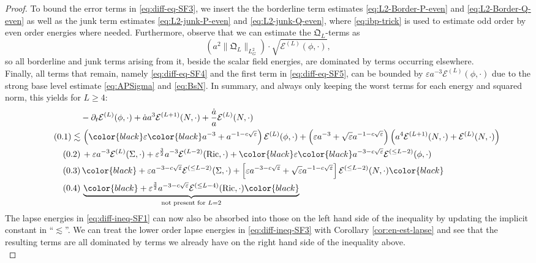\documentclass[11pt,leqno,textwidth=10cm]{amsart}
\numberwithin{equation}{section}
\theoremstyle{definition}
\theoremstyle{plain}
\newcommand{\1}{\mathbbm{1}}
\newcommand{\E}{\mathcal{E}}
\newcommand{\Ric}{\text{\normalfont{Ric}}}
\renewcommand{\epsilon}{\varepsilon}
\newcommand{\del}{\partial}
\newcommand{\Lap}{\Delta}
\newcommand{\numberthis}{\addtocounter{equation}{1}\tag{\theequation}}
\renewcommand{\theequation}{\arabic{section}.\arabic{equation}}
\newcommand{\change}[1]{\color{black}#1\color{black}}
\begin{document}
\begin{proof}
To bound the error terms in \eqref{eq:diff-eq-SF3}, we insert the the borderline term estimates \eqref{eq:L2-Border-P-even} and \eqref{eq:L2-Border-Q-even} as well as the junk term estimates \eqref{eq:L2-junk-P-even} and \eqref{eq:L2-junk-Q-even}, where \eqref{eq:ibp-trick} is used to estimate odd order by even order energies where needed. Furthermore, observe that we can estimate the $\mathfrak{Q}_L$-terms as
\[\left(a^2\|\mathfrak{Q}_L\|_{L^2_G}\right)\cdot \sqrt{\E^{(L)}(\phi,\cdot)},\]
so all borderline and junk terms arising from it, beside the scalar field \change{energies}, are dominated by terms occurring elsewhere.\\
Finally, all terms that remain, namely \eqref{eq:diff-eq-SF4} and the first term in \eqref{eq:diff-eq-SF5}, can be bounded by $\epsilon a^{-3}\E^{(L)}(\phi,\cdot)$ due to the strong base level estimate \eqref{eq:APSigma} and \eqref{eq:BsN}. In summary, and always only keeping the worst terms for each energy and squared norm, this yields for $L\geq 4$:
\begin{subequations}
\begin{align*}
&-\del_t\E^{(L)}(\phi,\cdot)+\dot{a}a^{3}\E^{(L+1)}(N,\cdot)+\frac{\dot{a}}a\E^{(L)}(N,\cdot)\\
\numberthis\label{eq:diff-ineq-SF1}\lesssim&\,\left(\change{\epsilon}a^{-3}+a^{-1-c\sqrt{\epsilon}}\right)\E^{(L)}(\phi,\cdot)+\left(\epsilon a^{-3}+\sqrt{\epsilon}a^{-1-c\sqrt{\epsilon}}\right)\left(a^4\E^{(L+1)}(N,\cdot)+\E^{(L)}(N,\cdot)\right)\\
\numberthis\label{eq:diff-ineq-SF2}&\,+\epsilon a^{-3}\E^{(L)}(\Sigma,\cdot)+\epsilon^\frac32 a^{-3}\E^{(L-2)}(\Ric,\cdot)+%
\change{\epsilon}a^{-3-c\sqrt{\epsilon}}\E^{(\leq L-2)}(\phi,\cdot)
\\
\numberthis\label{eq:diff-ineq-SF3}&\,\change{%
+\epsilon a^{-3-c\sqrt{\epsilon}}\E^{(\leq L-2)}(\Sigma,\cdot)+\left[\epsilon a^{-3-c\sqrt{\epsilon}}+\sqrt{\epsilon}a^{-1-c\sqrt{\epsilon}}\right]\E^{(\leq L-2)}(N,\cdot)}\\
\numberthis\label{eq:diff-ineq-SF4}&\,\underbrace{
\change{+\epsilon^\frac32a^{-3-c\sqrt{\epsilon}}\E^{(\leq L-4)}(\Ric,\cdot)}}_{\text{not present for }L=2}
\end{align*}
\end{subequations}
The lapse energies in \eqref{eq:diff-ineq-SF1} can now also be absorbed into those on the left hand side of the inequality by updating the implicit constant in \enquote{$\lesssim$}. We can treat the lower order lapse energies in \change{\eqref{eq:diff-ineq-SF3} }with Corollary \ref{cor:en-est-lapse} and see that the resulting terms are all dominated by terms we already have on the right hand side of the inequality above.\\


\end{proof}
\end{document}
